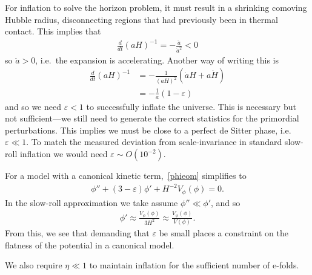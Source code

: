     For inflation to solve the horizon problem, it must result in a shrinking comoving
    Hubble radius, disconnecting regions that had previously been in thermal contact.
    This implies that
    \begin{align}
        \frac{d}{dt}\left(aH\right)^{-1} = -\frac{\ddot{a}}{\dot{a}^2} < 0
    \end{align}
    so $\ddot{a}>0$, i.e.\ the expansion is accelerating. Another way of writing this is
    \begin{align}
        \frac{d}{dt}\left(aH\right)^{-1} &= -\frac{1}{(aH)^2}\left(\dot{a}H+a\dot{H}\right)\\
            &= -\frac{1}{a}\left(1-\varepsilon\right)
    \end{align}
    and so we need $\varepsilon<1$ to successfully inflate the universe.
    This is necessary but not sufficient---we still need to generate
    the correct statistics for the primordial perturbations.
    This implies we must be close to a perfect de Sitter phase, i.e.\ $\varepsilon\ll1$.
    To match the measured deviation from scale-invariance in standard slow-roll
    inflation we would need $\varepsilon\sim O(10^{-2})$.


For a model with a canonical kinetic term,~\eqref{phieom} simplifies
to
\begin{align}
    \phi''+(3-\varepsilon)\phi'+H^{-2}V_{\phi}(\phi)=0.
\end{align}
In the slow-roll approximation we take assume $\phi''\ll\phi'$,
and so
\begin{align}
    \phi'\approx\frac{V_{\phi}(\phi)}{3H^2}\approx\frac{V_{\phi}(\phi)}{V(\phi)}.
\end{align}
From this, we see that demanding that $\varepsilon$ be small places a constraint
on the flatness of the potential in a canonical model.


We also require $\eta\ll1$ to maintain inflation for the sufficient number
of e-folds.




